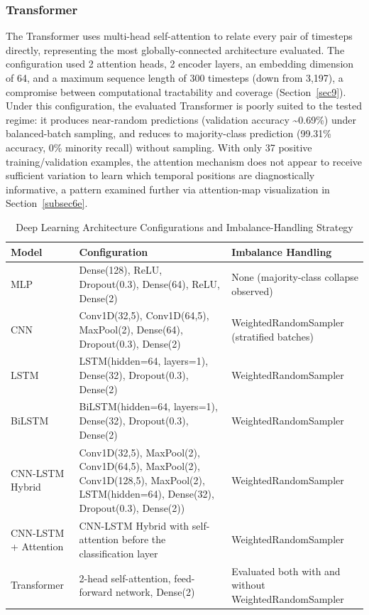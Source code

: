 \documentclass[preprint,11pt,times]{elsarticle}
\begin{document}
\subsubsection{Transformer}\label{subsubsec4b5}

The Transformer uses multi-head self-attention to relate every pair of timesteps directly, representing the most globally-connected architecture evaluated. The configuration used 2 attention heads, 2 encoder layers, an embedding dimension of 64, and a maximum sequence length of 300 timesteps (down from 3,197), a compromise between computational tractability and coverage (Section~\ref{sec9}). Under this configuration, the evaluated Transformer is poorly suited to the tested regime: it produces near-random predictions (validation accuracy \textasciitilde0.69\%) under balanced-batch sampling, and reduces to majority-class prediction (99.31\% accuracy, 0\% minority recall) without sampling. With only 37 positive training/validation examples, the attention mechanism does not appear to receive sufficient variation to learn which temporal positions are diagnostically informative, a pattern examined further via attention-map visualization in Section~\ref{subsec6e}.

\begin{table}[h]
\centering
\small
\caption{Deep Learning Architecture Configurations and Imbalance-Handling Strategy}
\label{tab:dl_configs}

\begin{tabular}{p{2.1cm} p{5.9cm} p{3.4cm}}
\toprule
Model & Configuration & Imbalance Handling \\
\midrule

MLP &
Dense(128), ReLU, Dropout(0.3), Dense(64), ReLU, Dense(2) &
None (majority-class collapse observed) \\

CNN &
Conv1D(32,5), Conv1D(64,5), MaxPool(2), Dense(64), Dropout(0.3), Dense(2) &
WeightedRandomSampler (stratified batches) \\

LSTM &
LSTM(hidden=64, layers=1), Dense(32), Dropout(0.3), Dense(2) &
WeightedRandomSampler \\

BiLSTM &
BiLSTM(hidden=64, layers=1), Dense(32), Dropout(0.3), Dense(2) &
WeightedRandomSampler \\

CNN-LSTM Hybrid &
Conv1D(32,5), MaxPool(2), Conv1D(64,5), MaxPool(2), Conv1D(128,5), MaxPool(2), LSTM(hidden=64), Dense(32), Dropout(0.3), Dense(2)) &
WeightedRandomSampler \\

CNN-LSTM + Attention &
CNN-LSTM Hybrid with self-attention before the classification layer &
WeightedRandomSampler \\

Transformer &
2-head self-attention, feed-forward network, Dense(2) &
Evaluated both with and without WeightedRandomSampler \\

\bottomrule
\end{tabular}
\end{table}
\end{document}
